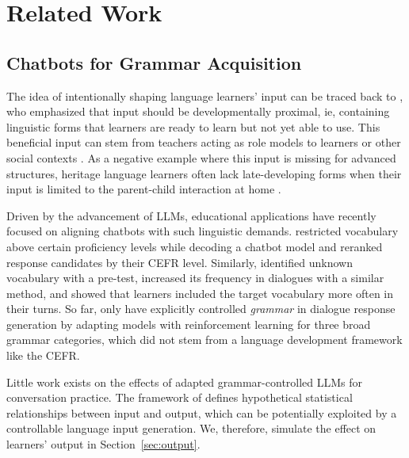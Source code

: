 \section{Related Work}
\label{sec:related_works}


\subsection{Chatbots for Grammar Acquisition}
The idea of intentionally shaping language learners' input can be traced back to
\citet{krashenSecondLanguageAcquisition1985}, who emphasized that input should be developmentally proximal, ie, containing linguistic forms that learners are ready to learn but not yet able to use.
This beneficial input can stem from teachers acting as role models to learners \citep{hepptProfessionalDevelopmentLanguage2022} or other social contexts \citep{pillingerStoryFarSystematic2022}. As a negative example where this input is missing for advanced structures, heritage language learners often lack late-developing forms when their input is limited to the parent-child interaction at home \citep{bayramDifferencesUseDeficiencies2019}.

Driven by the advancement of LLMs, educational applications have recently focused on aligning chatbots with such linguistic demands. \citet{tyenOpendomainChatbotLanguage2022} restricted vocabulary above certain proficiency levels while decoding a chatbot model and reranked response candidates by their CEFR level. %
Similarly, \citet{qianUserAdaptiveLanguage2023} identified unknown vocabulary with a pre-test, increased its frequency in dialogues with a similar method, and showed that learners included the target vocabulary more often in their turns.  %
So far, only \citet{okano-etal-2023-generating} have explicitly controlled \textit{grammar} in dialogue response generation by adapting models with reinforcement learning for three broad grammar categories, which did not stem from a language development framework like the CEFR.

Little work exists on the effects of adapted grammar-controlled LLMs for conversation practice. The framework of  defines hypothetical statistical relationships between input and output, which can be potentially exploited by a controllable language input generation. We, therefore, simulate the effect on learners' output in Section~\ref{sec:output}.

